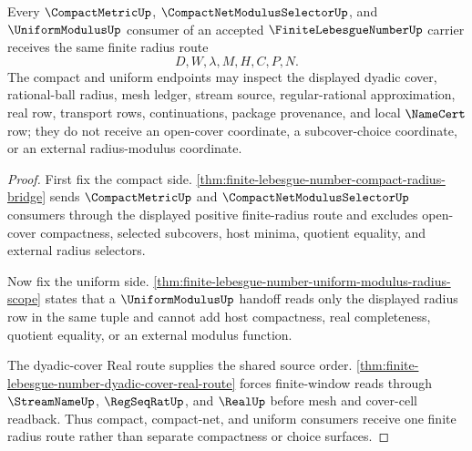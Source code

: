\begin{theorem}
\label{thm:finite-lebesgue-number-compact-uniform-bridge-soundness}
Every $\CompactMetricUp$, $\CompactNetModulusSelectorUp$, and $\UniformModulusUp$ consumer of an accepted $\FiniteLebesgueNumberUp$ carrier receives the same finite radius route
$$
D,W,\lambda,M,H,C,P,N .
$$
The compact and uniform endpoints may inspect the displayed dyadic cover, rational-ball radius, mesh ledger, stream source, regular-rational approximation, real row, transport rows, continuations, package provenance, and local $\NameCert$ row; they do not receive an open-cover coordinate, a subcover-choice coordinate, or an external radius-modulus coordinate.
\end{theorem}
\begin{proof}
First fix the compact side. \autoref{thm:finite-lebesgue-number-compact-radius-bridge} sends $\CompactMetricUp$ and $\CompactNetModulusSelectorUp$ consumers through the displayed positive finite-radius route and excludes open-cover compactness, selected subcovers, host minima, quotient equality, and external radius selectors.

Now fix the uniform side. \autoref{thm:finite-lebesgue-number-uniform-modulus-radius-scope} states that a $\UniformModulusUp$ handoff reads only the displayed radius row in the same tuple and cannot add host compactness, real completeness, quotient equality, or an external modulus function.

The dyadic-cover Real route supplies the shared source order. \autoref{thm:finite-lebesgue-number-dyadic-cover-real-route} forces finite-window reads through $\StreamNameUp$, $\RegSeqRatUp$, and $\RealUp$ before mesh and cover-cell readback. Thus compact, compact-net, and uniform consumers receive one finite radius route rather than separate compactness or choice surfaces.
\end{proof}

